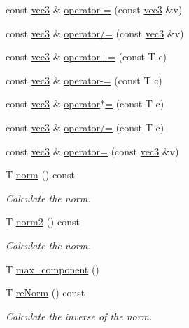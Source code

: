 \begin{DoxyCompactItemize}
const \mbox{\hyperlink{struct_space_h_1_1vec3}{vec3}} \& \mbox{\hyperlink{struct_space_h_1_1vec3_a54124bffc816d8dcf912422647bac6c3}{operator-\/=}} (const \mbox{\hyperlink{struct_space_h_1_1vec3}{vec3}} \&v)
\item 
const \mbox{\hyperlink{struct_space_h_1_1vec3}{vec3}} \& \mbox{\hyperlink{struct_space_h_1_1vec3_a0de32a9762524bf50e592c5a463c29e2}{operator/=}} (const \mbox{\hyperlink{struct_space_h_1_1vec3}{vec3}} \&v)
\item 
const \mbox{\hyperlink{struct_space_h_1_1vec3}{vec3}} \& \mbox{\hyperlink{struct_space_h_1_1vec3_a444d5277ca3ad78b88dbba50d45007f1}{operator+=}} (const T c)
\item 
const \mbox{\hyperlink{struct_space_h_1_1vec3}{vec3}} \& \mbox{\hyperlink{struct_space_h_1_1vec3_a78f7adf1ccf20819b5c9a536762933e0}{operator-\/=}} (const T c)
\item 
const \mbox{\hyperlink{struct_space_h_1_1vec3}{vec3}} \& \mbox{\hyperlink{struct_space_h_1_1vec3_ad4d8983185e2a69b9478c6f2baad2d36}{operator$\ast$=}} (const T c)
\item 
const \mbox{\hyperlink{struct_space_h_1_1vec3}{vec3}} \& \mbox{\hyperlink{struct_space_h_1_1vec3_afd7ec569421aa04734cebdb346b9bdbf}{operator/=}} (const T c)
\item 
const \mbox{\hyperlink{struct_space_h_1_1vec3}{vec3}} \& \mbox{\hyperlink{struct_space_h_1_1vec3_a958945cd614424f1c11daf9397370f6a}{operator=}} (const \mbox{\hyperlink{struct_space_h_1_1vec3}{vec3}} \&v)
\item 
T \mbox{\hyperlink{struct_space_h_1_1vec3_aeec869b0802a468ffff325efb2d0e780}{norm}} () const
\begin{DoxyCompactList}\small\item\em Calculate the norm. \end{DoxyCompactList}\item 
T \mbox{\hyperlink{struct_space_h_1_1vec3_a62dcbdc184d4228da839845c7e179eea}{norm2}} () const
\begin{DoxyCompactList}\small\item\em Calculate the norm. \end{DoxyCompactList}\item 
T \mbox{\hyperlink{struct_space_h_1_1vec3_a5bf7ae47f97a2269748d66933d719bd9}{max\+\_\+component}} ()
\item 
T \mbox{\hyperlink{struct_space_h_1_1vec3_a90d3f8ac98cf17cb20986997daaf9e0e}{re\+Norm}} () const
\begin{DoxyCompactList}\small\item\em Calculate the inverse of the norm. \end{DoxyCompactList}\item 

\end{DoxyCompactItemize}
